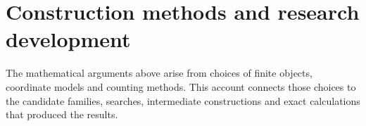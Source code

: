 \section{Construction methods and research development}

The mathematical arguments above arise from choices of finite objects, coordinate models and counting methods. This account connects those choices to the candidate families, searches, intermediate constructions and exact calculations that produced the results.




